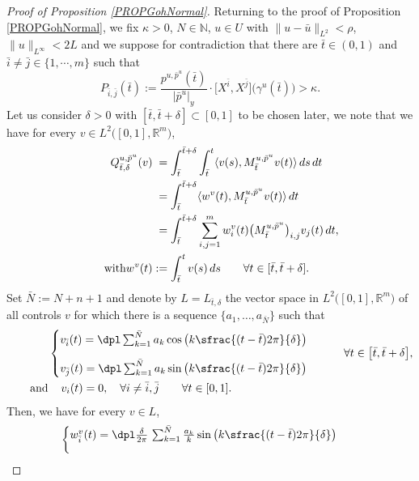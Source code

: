 \documentclass[JEP,XML,SOM,Unicode,NoFloatCountersInSection,published]{cedram}
\newcommand\R{\mathbb R}
\newcommand\N{\mathbb N}
\theoremstyle{definition}
\begin{document}
\begin{proof}[Proof of Proposition \ref{PROPGohNormal}]
Returning to the proof of Proposition \ref{PROPGohNormal}, we fix $\kappa>0$, $N\in \N$, $u\in U$ with $\|u-\bar{u}\|_{L^2}< \rho$, $\|u\|_{L^{\infty}}< 2L$ and we suppose for contradiction that there are $\bar{t} \in (0,1)$ and $\bar{i}\neq \bar{j} \in \{1,\cdots ,m\}$ such that
\begin{equation}\label{27oct1}
P_{\bar{i},\bar{j}} (\bar{t}) := \frac{ p^{u,\bar{p}^{u}}(\bar{t})}{|\bar{p}^u|_{y}} \cdot \bigl[X^{\bar{i}},X^{\bar{j}}\bigr] \bigl(\gamma^u(\bar{t}) \bigr) > \kappa.
\end{equation}
Let us consider $\delta>0$ with $[\bar{t},\bar{t}+\delta] \subset [0,1]$ to be chosen later, we note that we have for every $v \in L^2\bigl([0,1],\R^m\bigr)$,
\begin{align}\label{EQ27avril}
Q^{u,\bar{p}^u}_{\bar{t},\delta}(v) & \hphantom{:}=  \int_{\bar{t}}^{\bar{t}+\delta} \int_{\bar{t}}^t \langle v(s), M_{\bar{t}}^{u,\bar{p}^u}v(t)\rangle \, ds \, dt\notag\\
& \hphantom{:}=  \int_{\bar{t}}^{\bar{t}+\delta} \langle w^v(t), M_{\bar{t}}^{u,\bar{p}^u}v(t)\rangle \, dt\\
& \hphantom{:}=  \int_{\bar{t}}^{\bar{t}+\delta} \sum_{i,j=1}^m w^v_i(t) \bigl(M_{\bar{t}}^{u,\bar{p}^u} \bigr)_{i,j} v_j(t) \, dt,\notag\\
\tag*{with}w^v(t) &:= \int_{\bar{t}}^t v(s) \, ds \qquad \forall t \in [\bar{t},\bar{t}+\delta].
\end{align}
Set $\bar{N}:=N+n+1$ and denote by $L= L_{\bar{t},\delta}$ the vector space in $L^2\bigl([0,1],\R^m\bigr)$ of all controls $v$ for which there is a sequence $\{a_1, \ldots, a_{\bar{N}}\}$ such that
\begin{align*}
&\begin{cases}
v_{\bar{i}}(t) = \dpl\sum_{k=1}^{\bar{N}} a_k \cos \left(k \sfrac{(t-\bar{t}) 2\pi}{\delta}\right) \\[10pt]
v_{\bar{j}}(t) = \dpl\sum_{k=1}^{\bar{N}} a_k \sin \left(k \sfrac{(t-\bar{t}) 2\pi}{\delta}\right)
\end{cases}
\qquad \forall t \in \bigl[ \bar{t},\bar{t}+\delta\bigr],\\
\tag*{and} &\hspace*{4mm} v_i(t) =0, \quad \forall i\neq \bar{i},\bar{j} \qquad \forall t \in [0,1].
\end{align*}
Then, we have for every $v\in L$,
\begin{align*}
&\begin{cases}
w^v_{\bar{i}}(t) =\dpl \frac{\delta}{2\pi} \, \sum_{k=1}^{\bar{N}} \frac{a_k}{k} \sin \left(k \sfrac{(t-\bar{t}) 2\pi}{\delta}\right) \\[10pt]

\end{cases}
\end{align*}
\end{proof}
\end{document}
